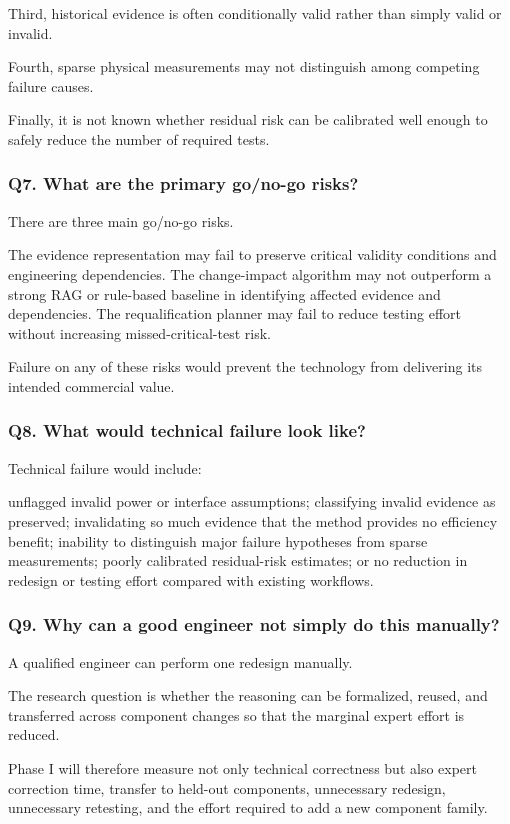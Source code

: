 \documentclass[12pt,letterpaper]{article}
\begin{document}
Third, historical evidence is often conditionally valid rather than simply valid or invalid.

Fourth, sparse physical measurements may not distinguish among competing failure causes.

Finally, it is not known whether residual risk can be calibrated well enough to safely reduce the number of required tests.

\subsubsection{Q7. What are the primary go/no-go risks?}

There are three main go/no-go risks.

The evidence representation may fail to preserve critical validity conditions and engineering dependencies.
The change-impact algorithm may not outperform a strong RAG or rule-based baseline in identifying affected evidence and dependencies.
The requalification planner may fail to reduce testing effort without increasing missed-critical-test risk.

Failure on any of these risks would prevent the technology from delivering its intended commercial value.

\subsubsection{Q8. What would technical failure look like?}

Technical failure would include:

unflagged invalid power or interface assumptions;
classifying invalid evidence as preserved;
invalidating so much evidence that the method provides no efficiency benefit;
inability to distinguish major failure hypotheses from sparse measurements;
poorly calibrated residual-risk estimates; or
no reduction in redesign or testing effort compared with existing workflows.
\subsubsection{Q9. Why can a good engineer not simply do this manually?}

A qualified engineer can perform one redesign manually.

The research question is whether the reasoning can be formalized, reused, and transferred across component changes so that the marginal expert effort is reduced.

Phase I will therefore measure not only technical correctness but also expert correction time, transfer to held-out components, unnecessary redesign, unnecessary retesting, and the effort required to add a new component family.
\end{document}
